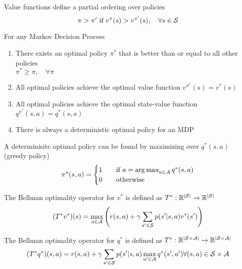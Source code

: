 Value functions define a partial ordering over policies
\[\pi > \pi' \text{ if } v^\pi(s) > v^{\pi'}(s),\quad \forall s \in \mathcal{S}\]

\begin{theorem}
    For any Markov Decision Process
    \begin{enumerate}
        \item There exists an optimal policy $\pi^*$ that is better than or equal to all other policies \\
        $\pi^* \ge \pi, \quad \forall \pi$
        \item All optimal policies achieve the optimal value function $v^{\pi^*}(s) = v^*(s)$
        \item All optimal policies achieve the optimal state-value function $q^{\pi^*}(s, a) = q^*(s,a)$
        \item There is always a deterministic optimal policy for an MDP
    \end{enumerate}
\end{theorem}

A determinisitc optimal policy can be found by maximizing over $q^*(s,a)$ (greedy policy)
\begin{equation*}
    \pi^*(s,a) = 
    \begin{cases}
        1 \quad & \text{if } a = \operatorname*{arg\,max}_{a \in \mathcal{A}}q^*(s,a)\\
        0 \quad & \text{otherwise}
    \end{cases}
\end{equation*}


\begin{definition}
    The Bellman optimality operator for $v^*$ is defined as $T^* : \mathbb{R}^{|\mathcal{S}|} \to \mathbb{R}^{|\mathcal{S}|}$
    \[(T^* v^*)(s) = \max_{a \in \mathcal{A}}\left(r(s,a) + \gamma \sum_{s' \in \mathcal{S}}p(s'|s,a)v^*(s')\right)\]
\end{definition}

\begin{definition}
    The Bellman optimality operator for $q^*$ is defined as $T^* : \mathbb{R}^{|\mathcal{S} \times \mathcal{A}|} \to \mathbb{R}^{|\mathcal{S} \times \mathcal{A}|}$
    \[(T^* q^*)(s, a) = r(s,a) + \gamma \sum_{s' \in \mathcal{S}}p(s'|s,a)\max_{a' \in \mathcal{A}}q^*(s',a') \forall (s,a) \in \mathcal{S}\times\mathcal{A}\]
\end{definition}

